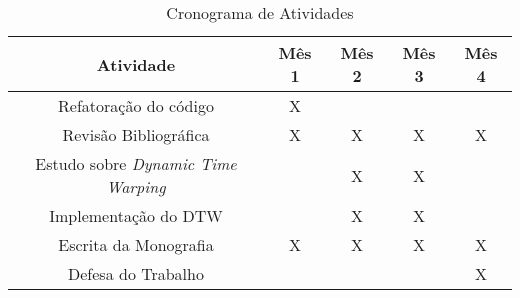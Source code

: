 \begin{table}[ht] 
    \centering
    \caption{Cronograma de Atividades}
    \label{tab:crono}
    \begin{tabular}{|c|c|c|c|c|}
    \hline
    \textbf{Atividade} & \textbf{Mês 1} & \textbf{Mês 2} & \textbf{Mês 3} & \textbf{Mês 4} \\ \hline
    Refatoração do código & X &  &  & \\ \hline
    Revisão Bibliográfica &  X & X & X & X \\ \hline
    Estudo sobre \textit{Dynamic Time Warping} &  & X & X & \\ \hline
    Implementação do DTW &  & X & X & \\ \hline
    Escrita da Monografia & X & X & X & X \\ \hline
    Defesa do Trabalho &  &  &  &  X\\ \hline
    \end{tabular}
\end{table}
